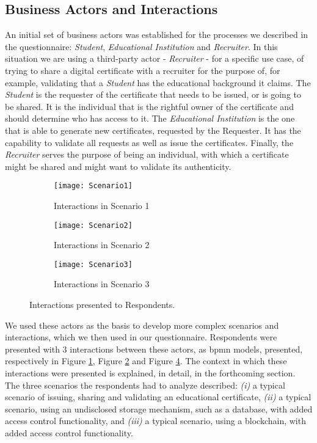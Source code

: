 \subsection{Business Actors and Interactions}

An initial set of business actors was established for the processes we described in the questionnaire: \textit{Student}, \textit{Educational Institution} and \textit{Recruiter}. In this situation we are using a third-party actor - \textit{Recruiter} - for a specific use case, of trying to share a digital certificate with a recruiter for the purpose of, for example, validating that a \textit{Student} has the educational background it claims. The \textit{Student} is the requester of the certificate that needs to be issued, or is going to be shared. It is the individual that is the rightful owner of the certificate and should determine who has access to it. The \textit{Educational Institution} is the one that is able to generate new certificates, requested by the Requester. It has the capability to validate all requests as well as issue the certificates. Finally, the \textit{Recruiter} serves the purpose of being an individual, with which a certificate might be shared and might want to validate its authenticity.

\begin{figure}[htb]
	\centering
	\begin{subfigure}[b]{0.3\textwidth}
		\centering
		\texttt{[image: Scenario1]}
		\caption{Interactions in Scenario 1}
		\label{fig: Scenario1}
	\end{subfigure}
	\begin{subfigure}[b]{0.3\textwidth}
		\centering
		\texttt{[image: Scenario2]}
		\caption{Interactions in Scenario 2}
		\label{fig: Scenario2}
	\end{subfigure}
	\begin{subfigure}[b]{0.3\textwidth}
		\centering
		\texttt{[image: Scenario3]}
		\caption{Interactions in Scenario 3}
		\label{fig: Scenario3}
	\end{subfigure}

	\caption{Interactions presented to Respondents.}
\end{figure}

We used these actors as the basis to develop more complex scenarios and interactions, which we then used in our questionnaire. Respondents were presented with 3 interactions between these actors, as \gls{bpmn} \cite{BPMN} models, presented, respectively in Figure \ref{fig: Scenario1}, Figure \ref{fig: Scenario2} and Figure \ref{fig: Scenario3}. The context in which these interactions were presented is explained, in detail, in the forthcoming section. The three scenarios the respondents had to analyze described:
\emph{(i)} a typical scenario of issuing, sharing and validating an educational certificate, \emph{(ii)} a typical scenario, using an undisclosed storage mechanism, such as a database, with added access control functionality, and \emph{(iii)} a typical scenario, using a blockchain, with added access control functionality.



